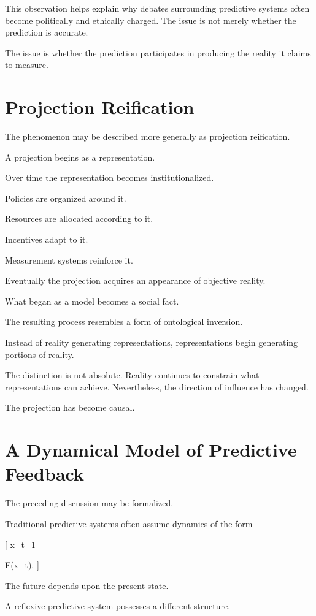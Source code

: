 \documentclass[11pt,oneside,openany]{book}
\begin{document}
This observation helps explain why debates surrounding predictive systems often become politically and ethically charged. The issue is not merely whether the prediction is accurate.

The issue is whether the prediction participates in producing the reality it claims to measure.

\section{Projection Reification}

The phenomenon may be described more generally as projection reification.

A projection begins as a representation.

Over time the representation becomes institutionalized.

Policies are organized around it.

Resources are allocated according to it.

Incentives adapt to it.

Measurement systems reinforce it.

Eventually the projection acquires an appearance of objective reality.

What began as a model becomes a social fact.

The resulting process resembles a form of ontological inversion.

Instead of reality generating representations, representations begin generating portions of reality.

The distinction is not absolute. Reality continues to constrain what representations can achieve. Nevertheless, the direction of influence has changed.

The projection has become causal.

\section{A Dynamical Model of Predictive Feedback}

The preceding discussion may be formalized.

Traditional predictive systems often assume dynamics of the form

[
x_{t+1}

F(x_t).
]

The future depends upon the present state.

A reflexive predictive system possesses a different structure.
\end{document}

